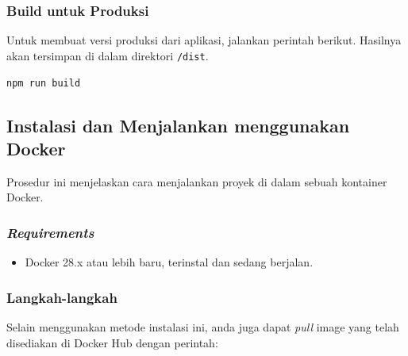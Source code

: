 \documentclass{article}
\newcommand{\inlinecode}[1]{%
    \begin{mdframed}[style=codestyle]
    \texttt{\small #1}
    \end{mdframed}
}
\begin{document}
    \subsubsection{Build untuk Produksi}
    Untuk membuat versi produksi dari aplikasi, jalankan perintah berikut.
    Hasilnya akan tersimpan di dalam direktori \texttt{/dist}.

    \inlinecode{npm run build}

    \subsection{Instalasi dan Menjalankan menggunakan Docker}
    Prosedur ini menjelaskan cara menjalankan proyek di dalam sebuah kontainer Docker.

    \subsubsection{\textit{Requirements}}
    \begin{itemize}
        \item Docker 28.x atau lebih baru, terinstal dan sedang berjalan.
    \end{itemize}

    \subsubsection{Langkah-langkah}
    Selain menggunakan metode instalasi ini, anda juga dapat \textit{pull} image yang telah disediakan di Docker Hub dengan perintah:
\end{document}
